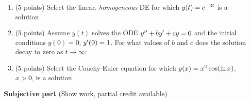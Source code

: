 \documentclass{article}
\begin{document}
\begin{enumerate}

\item (5 points) Select the linear, {\em homogeneous} DE for which $y(t)=e\sp{-3t}$ is a solution

\item (5 points) Assume $y(t)$ solves the ODE $y\sp{\prime\prime}+by\sp\prime+cy=0$ and the initial conditions $y(0)=0$, $y\sp\prime(0)=1$.  For what values of $b$ and $c$ does the solution decay to zero as $t\rightarrow\infty$:

\item (5 points) Select the Cauchy-Euler equation for which $y(x)=x\sp2\cos(\ln x)$, $x>0$, is a solution

\end{enumerate}

\newpage\noindent
{\bf Subjective part} (Show work, partial credit available)
\end{document}
